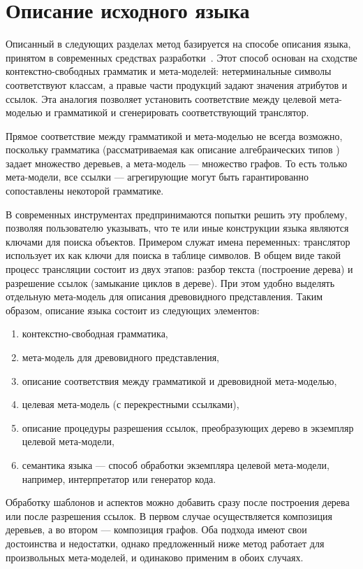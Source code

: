 \chapter{Описание исходного языка}

Описанный в следующих разделах метод базируется на способе описания языка, принятом в современных средствах разработки~\cite{xText}. Этот способ основан на сходстве контекстно-свободных грамматик и мета-моделей: нетерминальные символы соответствуют классам, а правые части продукций задают значения атрибутов и ссылок. Эта аналогия позволяет установить соответствие между целевой мета-моделью и грамматикой и сгенерировать соответствующий транслятор.

Прямое соответствие между грамматикой и мета-моделью не всегда возможно, поскольку грамматика (рассматриваемая как описание алгебраических типов \cite{?}) задает множество деревьев, а мета-модель --- множество графов. То есть только мета-модели, все ссылки --- агрегирующие могут быть гарантированно сопоставлены некоторой грамматике.

В современных инструментах предпринимаются попытки решить эту проблему, позволяя пользователю указывать, что те или иные конструкции языка являются ключами для поиска объектов. Примером служат имена переменных: транслятор использует их как ключи для поиска в таблице символов. В общем виде такой процесс трансляции состоит из двух этапов: разбор текста (построение дерева) и разрешение ссылок (замыкание циклов в дереве).
При этом удобно выделять отдельную мета-модель для описания древовидного представления. Таким образом, описание языка состоит из следующих элементов:
\begin{enumerate}
\item контекстно-свободная грамматика,
\item мета-модель для древовидного представления,
\item описание соответствия между грамматикой и древовидной мета-моделью,
\item целевая мета-модель (с перекрестными ссылками),
\item описание процедуры разрешения ссылок, преобразующих дерево в экземпляр целевой мета-модели,
\item семантика языка --- способ обработки экземпляра целевой мета-модели, например, интерпретатор или генератор кода.
\end{enumerate}

Обработку шаблонов и аспектов можно добавить сразу после построения дерева или после разрешения ссылок. В первом случае осуществляется композиция деревьев, а во втором --- композиция графов. Оба подхода имеют свои достоинства и недостатки, однако предложенный ниже метод работает для произвольных мета-моделей, и одинаково применим в обоих случаях.



